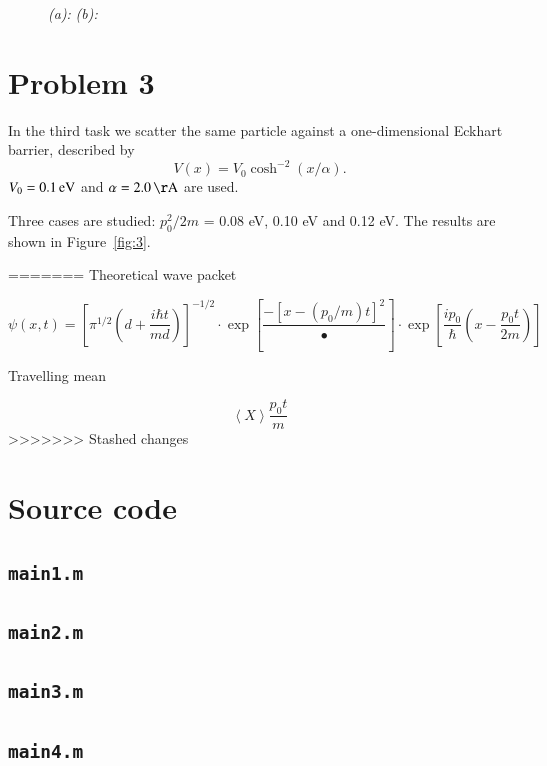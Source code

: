 \begin{figure}
\begin{subfigure}{0.7\textwidth}
\caption{}
\label{fig:2_a}
\end{subfigure}
\begin{subfigure}{0.7\textwidth}
\caption{}
\label{fig:2_b}
\end{subfigure}
\caption{\textit{(a):}  \textit{(b):} }
\label{fig:2}
\end{figure}


\section*{Problem 3}

In the third task we scatter the same particle against a one-dimensional Eckhart barrier, described by
\begin{equation}
V(x) = V_0 \cosh^{-2} (x/\alpha).
\end{equation}
$V_0 = \unit[0.1]{eV}$ and $\alpha = \unit[2.0]{\AA}$ are used.

Three cases are studied: $p_0^2/2m$ = 0.08 eV, 0.10 eV and 0.12 eV. The results are shown in Figure~\ref{fig:3}.


=======
Theoretical wave packet 

\begin{equation}
\psi(x,t) = \left[
\pi^{1/2}\left(
d+\frac{i\hbar t}{md}
\right)
\right]^{-1/2}
\cdot \exp\left[
\frac{-\left[x-\left(p_0/m\right)t\right]^2}{•}
\right]
\cdot \exp\left[
\frac{ip_0}{\hbar}\left(x-\frac{p_0t}{2m}\right)
\right]
\end{equation}


Travelling mean

\begin{equation}
\left<X\right>\frac{p_0t}{m}
\end{equation}
>>>>>>> Stashed changes




\appendix
\section{Source code}

\subsection{\texttt{main1.m}}


\subsection{\texttt{main2.m}}


\subsection{\texttt{main3.m}}


\subsection{\texttt{main4.m}}




